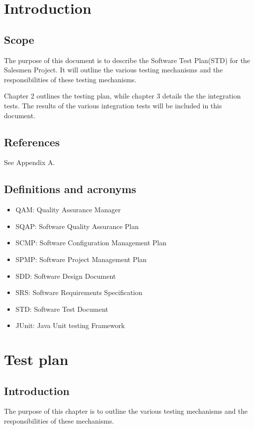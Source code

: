 \documentclass[salesmen, twoside]{../../../templates/latex/2009/softproj}
\begin{document}
\begin{projdoc}
\chapter{Introduction}
\section{Scope}
The purpose of this document is to describe the Software Test Plan(STD) for the Salesmen Project\cite{se020910}. It will outline the various testing mechanisms and the responsibilities of these testing mechanisms. 

Chapter 2 outlines the testing plan, while chapter 3 details the the integration tests. The results of the various integration tests will be included in this document.


\section{References}
See Appendix A.

\section{Definitions and acronyms}
\begin{itemize}
\item QAM: Quality Assurance Manager
\item SQAP: Software Quality Assurance Plan
\item SCMP: Software Configuration Management Plan 
\item SPMP: Software Project Management Plan
\item SDD: Software Design Document
\item SRS: Software Requirements Specification
\item STD: Software Test Document
\item JUnit: Java Unit testing Framework
\end{itemize}

\chapter{Test plan}
\section{Introduction}
The purpose of this chapter is to outline the various testing mechanisms and the responsibilities of these mechanisms.


\end{projdoc}
\end{document}
